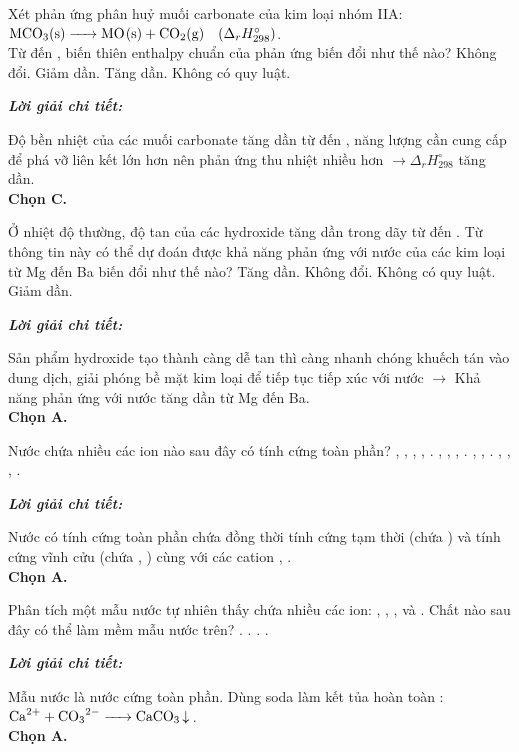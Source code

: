 \documentclass[11pt,a4paper]{article}
\def\loigiai#1{
\par\begingroup\color{blue!80!black}\small
\noindent\textbf{\textit{Lời giải chi tiết:}}\par
#1\par\endgroup}
\begin{document}
\begin{ex}
Xét phản ứng phân huỷ muối carbonate của kim loại nhóm IIA: $\ce{MCO3(s) -> MO(s) + CO2(g)} \quad (\Delta_r H^\circ_{298})$.\\
Từ  đến , biến thiên enthalpy chuẩn của phản ứng biến đổi như thế nào?
\choice
{Không đổi.}
{Giảm dần.}
{\True Tăng dần.}
{Không có quy luật.}
\loigiai{
Độ bền nhiệt của các muối carbonate tăng dần từ \ce{MgCO3} đến \ce{BaCO3}, năng lượng cần cung cấp để phá vỡ liên kết lớn hơn nên phản ứng thu nhiệt nhiều hơn $\rightarrow \Delta_r H^\circ_{298}$ tăng dần.\\
\textbf{Chọn C.}}
\end{ex}

\begin{ex}
Ở nhiệt độ thường, độ tan của các hydroxide tăng dần trong dãy từ  đến . Từ thông tin này có thể dự đoán được khả năng phản ứng với nước của các kim loại từ Mg đến Ba biến đổi như thế nào?
\choice
{\True Tăng dần.}
{Không đổi.}
{Không có quy luật.}
{Giảm dần.}
\loigiai{
Sản phẩm hydroxide tạo thành càng dễ tan thì càng nhanh chóng khuếch tán vào dung dịch, giải phóng bề mặt kim loại để tiếp tục tiếp xúc với nước $\rightarrow$ Khả năng phản ứng với nước tăng dần từ Mg đến Ba.\\
\textbf{Chọn A.}}
\end{ex}

\begin{ex}
Nước chứa nhiều các ion nào sau đây có tính cứng toàn phần?
\choice
{\True {}, , , , .}
{, , , .}
{, , .}
{, , , .}
\loigiai{
Nước có tính cứng toàn phần chứa đồng thời tính cứng tạm thời (chứa \ce{HCO3-}) và tính cứng vĩnh cửu (chứa \ce{Cl-}, \ce{SO4^2-}) cùng với các cation \ce{Ca^2+}, \ce{Mg^2+}.\\
\textbf{Chọn A.}}
\end{ex}

\begin{ex}
Phân tích một mẫu nước tự nhiên thấy chứa nhiều các ion: , , ,  và . Chất nào sau đây có thể làm mềm mẫu nước trên?
\choice
{\True {}.}
{.}
{.}
{.}
\loigiai{
Mẫu nước là nước cứng toàn phần. Dùng soda \ce{Na2CO3} làm kết tủa hoàn toàn \ce{Ca^2+}: $\ce{Ca^2+ + CO3^2- -> CaCO3 v}$.\\
\textbf{Chọn A.}}
\end{ex}
\end{document}
